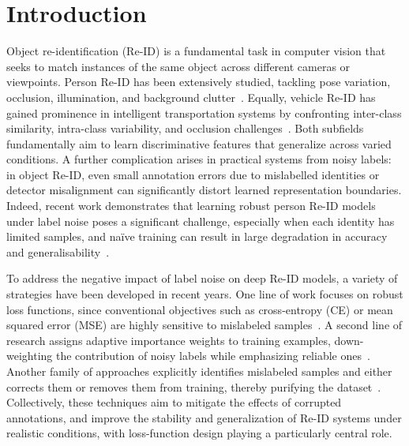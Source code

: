 \documentclass[lettersize,journal]{IEEEtran}
\begin{document}
\section{Introduction}

Object re-identification (Re-ID) is a fundamental task in computer vision that seeks to match instances of the same object across different cameras or viewpoints. Person Re-ID has been extensively studied, tackling pose variation, occlusion, illumination, and background clutter~\cite{36}. Equally,  vehicle Re-ID has gained prominence in intelligent transportation systems by confronting inter-class similarity, intra-class variability, and occlusion challenges~\cite{37}. Both subfields fundamentally aim to learn discriminative features that generalize across varied conditions. A further complication arises in practical systems from noisy labels: in object Re-ID, even small annotation errors due to mislabelled identities or detector misalignment can significantly distort learned representation boundaries. Indeed, recent work demonstrates that learning robust person Re-ID models under label noise poses a significant challenge, especially when each identity has limited samples, and naïve training can result in large degradation in accuracy and generalisability~\cite{22,23}.

To address the negative impact of label noise on deep Re-ID models, a variety of strategies have been developed in recent years. One line of work focuses on robust loss functions, since conventional objectives such as cross-entropy (CE) or mean squared error (MSE) are highly sensitive to mislabeled samples~\cite{1,2,3}. A second line of research assigns adaptive importance weights to training examples, down-weighting the contribution of noisy labels while emphasizing reliable ones~\cite{4,5,6}. Another family of approaches explicitly identifies mislabeled samples and either corrects them or removes them from training, thereby purifying the dataset~\cite{7,8,9}. Collectively, these techniques aim to mitigate the effects of corrupted annotations, and improve the stability and generalization of Re-ID systems under realistic conditions, with loss-function design playing a particularly central role.
\end{document}
